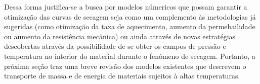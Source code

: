 Dessa forma justifica-se a busca por modelos númericos que possam garantir a
otimização das curvas de secagem seja como um complemento às metodologias já
sugeridas (como otimização da taxa de aquecimento, aumento da permebailidade ou
aumento da resistência mecânica) ou ainda através de novas estratégias
descobertas através da possibilidade de se obter os campos de pressão e
temperatura no interior do material durante o fenômeno de secagem. Portanto, a
próxima seção traz uma breve revisão dos modelos existentes que descrevem o
transporte de massa e de energia de materiais sujeitos à altas
temperaturas.
     
        
